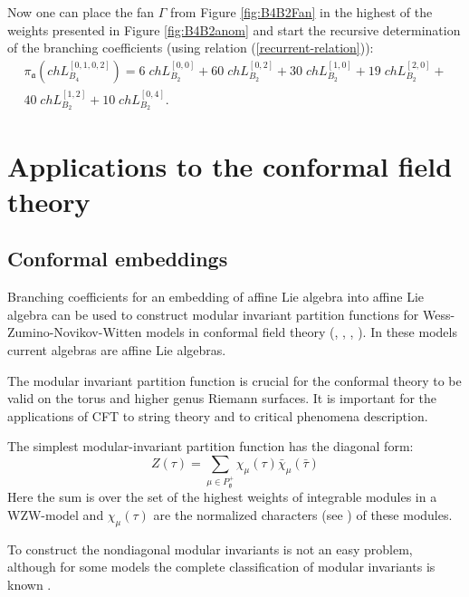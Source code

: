 \documentclass[12pt]{iopart}
\theoremstyle{definition}
\newcommand{\af}{\mathfrak{a}}
\begin{document}
Now one can place the fan $\Gamma$ from Figure \ref{fig:B4B2Fan} in the highest of the weights
presented in Figure \ref{fig:B4B2anom} and start the recursive determination of the branching coefficients
(using relation (\ref{recurrent-relation})):
\begin{eqnarray*}
  \label{eq:24}
  \pi_{\af} \left(ch L^{\left[0,1,0,2\right]}_{B_4}\right) = 6 \; ch L^{\left[0,0\right]}_{B_2}+ 60
  \; ch L_{B_2}^{\left[0,2\right]}+ 30 \; ch L_{B_2}^{\left[1,0\right]}+ 19 \; ch L_{B_2}^{\left[2,0\right]}+\\
  40 \; ch L_{B_2}^{\left[1,2\right]}+ 10 \; ch L_{B_2}^{\left[0,4\right]}.
\end{eqnarray*}
\section{Applications to the conformal field theory}
\label{sec:phys-appl}

\subsection{Conformal embeddings}
\label{sec:conformal-embeddings}

Branching coefficients for an embedding of affine Lie algebra into
affine Lie algebra can be used to construct modular invariant
partition functions for Wess-Zumino-Novikov-Witten models in conformal field theory
(\cite{difrancesco1997cft}, \cite{Walton:1999xc}, \cite{walton1989conformal}, \cite{schellekens1986conformal}).
In these models current algebras are affine Lie algebras.

The modular invariant partition function is crucial for the conformal theory to be valid
on the torus and higher genus Riemann surfaces. It is important for the applications of
CFT to string theory and to critical phenomena description.

The simplest modular-invariant partition function has the diagonal form:
\begin{equation}
  \label{eq:34}
   Z(\tau)=\sum_{ \mu\in P^{+}_{\mathfrak{g}}} \chi_{\mu}(\tau)\bar \chi_{\mu}(\bar \tau)
\end{equation}
Here the sum is over the set of the highest weights of integrable modules in a WZW-model
and $\chi_{\mu}(\tau)$ are the normalized characters (see \cite{difrancesco1997cft}) of these modules.

To construct the nondiagonal modular invariants is not an easy problem,
although for some models the complete classification of modular invariants is known \cite{1994hepthGannon,1995JMPGannon}.
\end{document}

